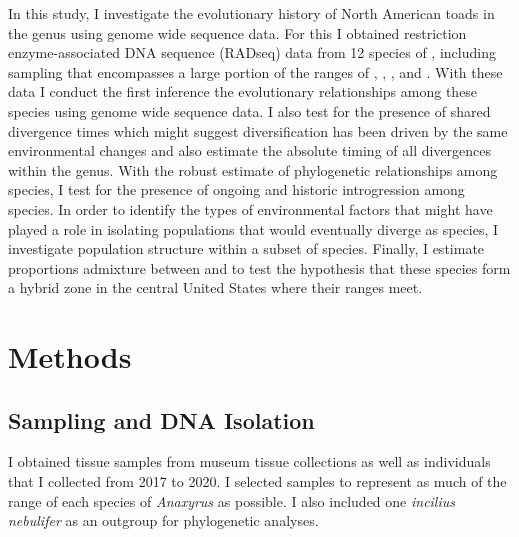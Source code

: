 In this study, I investigate the evolutionary history of North American
toads in the genus \anaxyrus using genome wide sequence data. 
For this I obtained restriction enzyme-associated DNA sequence (RADseq) data
from 12 species of \anaxyrus, including sampling that encompasses a 
large portion of the ranges of \amer, \fowl, \terr, and \wood.
With these data I conduct the first inference the evolutionary relationships 
among these species using genome wide sequence data. 
I also test for the presence of shared divergence times which might suggest
\anaxyrus diversification has been driven by the same environmental changes
and also estimate the absolute timing of all divergences within the genus.
With the robust estimate of phylogenetic relationships among \anaxyrus species, 
I test for the presence of ongoing and historic introgression among \anaxyrus species.
In order to identify the types of environmental factors that might have played
a role in isolating populations that would eventually diverge as species,
I investigate population structure within a subset of \anaxyrus species.
Finally, I estimate proportions admixture between \fowl and \wood to test
the hypothesis that these species form a hybrid zone in the central United  
States where their ranges meet.



\section{Methods}
\subsection{Sampling and DNA Isolation}
I obtained tissue samples from museum tissue collections as well as individuals   
that I collected from 2017 to 2020. I selected samples to represent as much
of the range of each species of \textit{Anaxyrus} as possible.
I also included one \textit{incilius nebulifer} as an outgroup for phylogenetic analyses.

